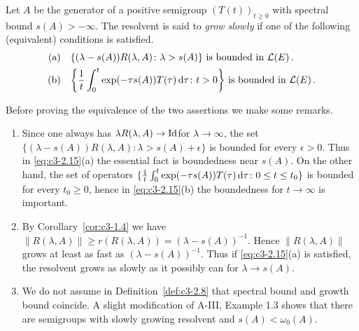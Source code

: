 \begin{definition}\label{def:c3-2.8}
	Let $A$ be the generator of a positive semigroup $(T(t))_{t \geq 0}$ with spectral bound $s(A) > -\infty$.
	The resolvent is said to \emph{grow slowly} if one of the following (equivalent) conditions is satisfied.
	\begin{equation}\label{eq:c3-2.15}
	\begin{aligned}
	\text{(a)}\quad & \text{$\{(\lambda-s(A))R(\lambda,A) \colon \lambda > s(A)\}$ is bounded in $\mathcal{L}(E)$}\,.\\
	\text{(b)}\quad & \text{$\left\{\frac{1}{t} \int_{0}^{t} \exp(-\tau s(A))T(\tau) \mathop{}\!\mathrm{d}{\tau} \colon t > 0\right\}$ is bounded in $\mathcal{L}(E)$}\,.
	\end{aligned}
	\end{equation}
\end{definition}
Before proving the equivalence of the two assertions we make some remarks.
\begin{remarks*}
\begin{enumerate}[\upshape (i), wide, labelindent=0.5em]
    \item 
    Since one always has \quad $\lambda R(\lambda,A) \to \operatorname{Id}$\quad for \quad $\lambda \to \infty$, 
    the set \quad $\{(\lambda-s(A))R(\lambda,A) \colon \lambda > s(A)+\epsilon\}$ is bounded for every $\epsilon > 0$. 
    Thus in \eqref{eq:c3-2.15}(a) the essential fact is boundedness near $s(A)$. 
    On the other hand, the set of operators $\{\frac{1}{t} \int_{0}^{t} \exp(-\tau s(A))T(\tau) \mathop{}\!\mathrm{d}{\tau} \colon 0 \leq t \leq t_{0} \}$ is bounded for every $t_{0} \geq 0$, hence in \eqref{eq:c3-2.15}(b) the boundedness for $t \to \infty$ is important.

    \item 
    By Corollary~\ref{cor:c3-1.4} we have $\|R(\lambda,A)\| \geq r(R(\lambda,A)) = (\lambda-s(A))^{-1}$. 
    Hence $\|R(\lambda,A)\|$ grows at least as fast as $(\lambda-s(A))^{-1}$. 
    Thus if \eqref{eq:c3-2.15}(a) is satisfied, the resolvent grows as slowly as it possibly can for $\lambda \to s(A)$.

    \item 
    We do not assume in Definition~\ref{def:c3-2.8} that spectral bound and growth bound coincide.
    A slight modification of A-III, Example 1.3 shows that there are semigroups with slowly growing resolvent and $s(A) < \omega_0(A)$.
\end{enumerate}
\end{remarks*}
